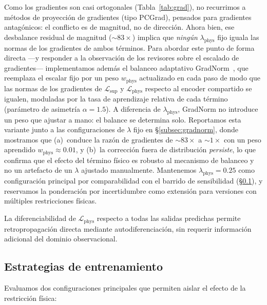 \documentclass[sigconf,ACM]{acmart}
\begin{document}
Como los gradientes son casi ortogonales (Tabla~\ref{tab:grad}), no recurrimos a métodos de proyección de gradientes (tipo PCGrad), pensados para gradientes antagónicos: el conflicto es de magnitud, no de dirección. Ahora bien, ese desbalance residual de magnitud (${\sim}83\times$) implica que \emph{ningún} $\lambda_\mathrm{phys}$ fijo iguala las normas de los gradientes de ambos términos. Para abordar este punto de forma directa ---y responder a la observación de los revisores sobre el escalado de gradientes--- implementamos además el balanceo adaptativo GradNorm~\cite{Chen2018GradNorm}, que reemplaza el escalar fijo por un peso $w_\mathrm{phys}$ actualizado en cada paso de modo que las normas de los gradientes de $\mathcal{L}_\mathrm{sup}$ y $\mathcal{L}_\mathrm{phys}$ respecto al encoder compartido se igualen, moduladas por la tasa de aprendizaje relativa de cada término (parámetro de asimetría $\alpha=1.5$). A diferencia de $\lambda_\mathrm{phys}$, GradNorm no introduce un peso que ajustar a mano: el balance se determina solo. Reportamos esta variante junto a las configuraciones de $\lambda$ fijo en §\ref{subsec:gradnorm}, donde mostramos que (a)~conduce la razón de gradientes de ${\sim}83\times$ a ${\sim}1\times$ con un peso aprendido $w_\mathrm{phys}\!\approx\!0.01$, y (b)~la corrección fuera de distribución \emph{persiste}, lo que confirma que el efecto del término físico es robusto al mecanismo de balanceo y no un artefacto de un $\lambda$ ajustado manualmente. Mantenemos $\lambda_\mathrm{phys}=0.25$ como configuración principal por comparabilidad con el barrido de sensibilidad (§\ref{subsec:training}), y reservamos la ponderación por incertidumbre como extensión para versiones con múltiples restricciones físicas.

La diferenciabilidad de $\mathcal{L}_{\mathrm{phys}}$ respecto a todas las salidas predichas permite retropropagación directa mediante autodiferenciación, sin requerir información adicional del dominio observacional.

\subsection{Estrategias de entrenamiento}
\label{subsec:training}

Evaluamos dos configuraciones principales que permiten aislar el efecto de la restricción física:
\end{document}
